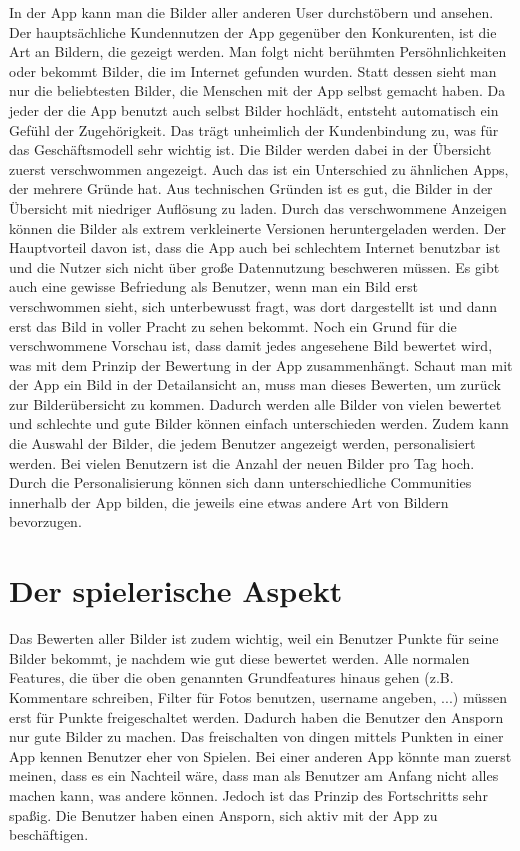 In der App kann man die Bilder aller anderen User durchstöbern und ansehen. Der hauptsächliche Kundennutzen der App gegenüber den Konkurenten, ist die Art an Bildern, die gezeigt werden. Man folgt nicht berühmten Persöhnlichkeiten oder bekommt Bilder, die im Internet gefunden wurden. Statt dessen sieht man nur die beliebtesten Bilder, die Menschen mit der App selbst gemacht haben. Da jeder der die App benutzt auch selbst Bilder hochlädt, entsteht automatisch ein Gefühl der Zugehörigkeit. Das trägt unheimlich der Kundenbindung zu, was für das Geschäftsmodell sehr wichtig ist.
Die Bilder werden dabei in der Übersicht zuerst verschwommen angezeigt. Auch das ist ein Unterschied zu ähnlichen Apps, der mehrere Gründe hat. Aus technischen Gründen ist es gut, die Bilder in der Übersicht mit niedriger Auflösung zu laden. Durch das verschwommene Anzeigen können die Bilder als extrem verkleinerte Versionen heruntergeladen werden. Der Hauptvorteil davon ist, dass die App auch bei schlechtem Internet benutzbar ist und die Nutzer sich nicht über große Datennutzung beschweren müssen. Es gibt auch eine gewisse Befriedung als Benutzer, wenn man ein Bild erst verschwommen sieht, sich unterbewusst fragt, was dort dargestellt ist und dann erst das Bild in voller Pracht zu sehen bekommt. Noch ein Grund für die verschwommene Vorschau ist, dass damit jedes angesehene Bild bewertet wird, was mit dem Prinzip der Bewertung in der App zusammenhängt.
Schaut man mit der App ein Bild in der Detailansicht an, muss man dieses Bewerten, um zurück zur Bilderübersicht zu kommen. Dadurch werden alle Bilder von vielen bewertet und schlechte und gute Bilder können einfach unterschieden werden. Zudem kann die Auswahl der Bilder, die jedem Benutzer angezeigt werden, personalisiert werden. Bei vielen Benutzern ist die Anzahl der neuen Bilder pro Tag hoch. Durch die Personalisierung können sich dann unterschiedliche Communities innerhalb der App bilden, die jeweils eine etwas andere Art von Bildern bevorzugen.

\section{Der spielerische Aspekt}

Das Bewerten aller Bilder ist zudem wichtig, weil ein Benutzer Punkte für seine Bilder bekommt, je nachdem wie gut diese bewertet werden. Alle normalen Features, die über die oben genannten Grundfeatures hinaus gehen (z.B. Kommentare schreiben, Filter für Fotos benutzen, username angeben, ...) müssen erst für Punkte freigeschaltet werden. Dadurch haben die Benutzer den Ansporn nur gute Bilder zu machen.
Das freischalten von dingen mittels Punkten in einer App kennen Benutzer eher von Spielen. Bei einer anderen App könnte man zuerst meinen, dass es ein Nachteil wäre, dass man als Benutzer am Anfang nicht alles machen kann, was andere können. Jedoch ist das Prinzip des Fortschritts sehr spaßig. Die Benutzer haben einen Ansporn, sich aktiv mit der App zu beschäftigen.

